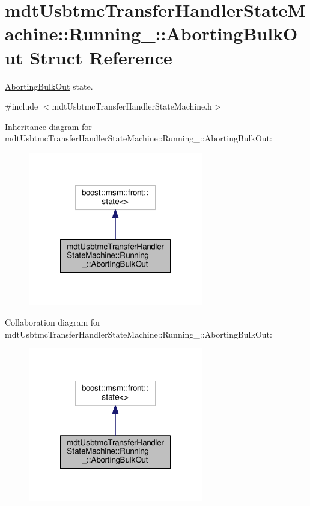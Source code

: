 \hypertarget{structmdt_usbtmc_transfer_handler_state_machine_1_1_running___1_1_aborting_bulk_out}{\section{mdt\-Usbtmc\-Transfer\-Handler\-State\-Machine\-:\-:Running\-\_\-\-:\-:Aborting\-Bulk\-Out Struct Reference}
\label{structmdt_usbtmc_transfer_handler_state_machine_1_1_running___1_1_aborting_bulk_out}
}


\hyperlink{structmdt_usbtmc_transfer_handler_state_machine_1_1_running___1_1_aborting_bulk_out}{Aborting\-Bulk\-Out} state.  




{\ttfamily \#include $<$mdt\-Usbtmc\-Transfer\-Handler\-State\-Machine.\-h$>$}



Inheritance diagram for mdt\-Usbtmc\-Transfer\-Handler\-State\-Machine\-:\-:Running\-\_\-\-:\-:Aborting\-Bulk\-Out\-:
\nopagebreak
\begin{figure}[H]
\begin{center}
\leavevmode
\includegraphics[width=216pt]{structmdt_usbtmc_transfer_handler_state_machine_1_1_running___1_1_aborting_bulk_out__inherit__graph}
\end{center}
\end{figure}


Collaboration diagram for mdt\-Usbtmc\-Transfer\-Handler\-State\-Machine\-:\-:Running\-\_\-\-:\-:Aborting\-Bulk\-Out\-:
\nopagebreak
\begin{figure}[H]
\begin{center}
\leavevmode
\includegraphics[width=216pt]{structmdt_usbtmc_transfer_handler_state_machine_1_1_running___1_1_aborting_bulk_out__coll__graph}
\end{center}
\end{figure}

